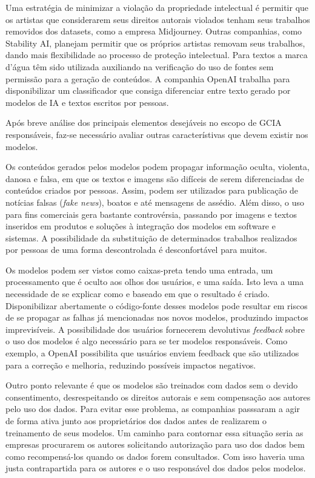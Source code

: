 Uma estratégia de minimizar a violação da propriedade intelectual é permitir que os artistas que considerarem seus direitos autorais
violados tenham seus trabalhos removidos dos datasets, como a empresa Midjourney. 
Outras companhias, como Stability AI, planejam permitir que os próprios artistas removam seus trabalhos, 
dando mais flexibilidade ao processo de proteção intelectual. 
Para textos a marca d'água têm sido utilizada auxiliando na verificação do uso de fontes sem permissão para a geração 
de conteúdos. A companhia OpenAI trabalha para disponibilizar um classificador que consiga diferenciar entre 
texto gerado por modelos de IA e textos escritos por pessoas.


Após breve análise dos principais elementos desejáveis no escopo de GCIA responsáveis, faz-se necessário avaliar  
outras característivas que devem existir nos modelos.

Os conteúdos gerados pelos modelos podem propagar informação oculta, violenta, danosa e falsa, em que os textos e 
imagens são difíceis de serem diferenciadas de conteúdos criados por pessoas. Assim, podem ser utilizados para publicação de notícias falsas (\textit{fake news}), boatos e até mensagens de assédio. 
Além disso, o uso para fins comerciais gera bastante controvérsia, passando por imagens e textos inseridos 
em produtos e soluções à integração dos modelos em software e sistemas. A possibilidade da substituição 
de determinados trabalhos realizados por pessoas de uma forma descontrolada é desconfortável para muitos.

Os modelos podem ser vistos como caixas-preta tendo uma entrada, um processamento que é oculto aos olhos dos usuários, 
e uma saída. Isto leva a uma necessidade de se explicar como e baseado em que o resultado é criado.
Disponibilizar abertamente o código-fonte desses modelos pode resultar em riscos de se propagar as falhas 
já mencionadas nos novos modelos, produzindo impactos imprevisíveis. 
A possibilidade dos usuários fornecerem devolutivas \textit{feedback} sobre o uso dos modelos é algo necessário
para se ter modelos responsáveis. Como exemplo, a OpenAI possibilita que usuários enviem feedback
que são utilizados para a correção e melhoria, reduzindo possíveis impactos negativos.

Outro ponto relevante é que os modelos são treinados com dados sem o devido consentimento, desrespeitando os direitos
autorais e sem compensação aos autores pelo uso dos dados. Para evitar esse problema, as companhias passsaram 
a agir de forma ativa junto aos proprietários dos dados antes de realizarem o treinamento de seus modelos. 
Um caminho para contornar essa situação seria as empresas procurarem os autores solicitando autorização 
para uso dos dados bem como recompensá-los quando os dados forem consultados. Com isso haveria uma justa contrapartida 
para os autores e o uso responsável dos dados pelos modelos.


